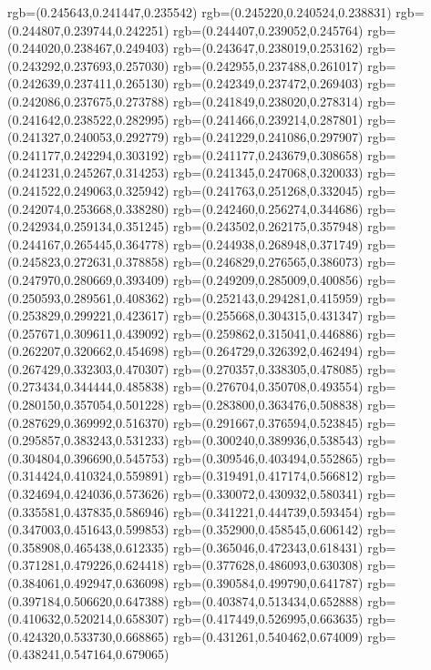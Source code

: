 {{{			rgb=(0.245643,0.241447,0.235542)
			rgb=(0.245220,0.240524,0.238831)
			rgb=(0.244807,0.239744,0.242251)
			rgb=(0.244407,0.239052,0.245764)
			rgb=(0.244020,0.238467,0.249403)
			rgb=(0.243647,0.238019,0.253162)
			rgb=(0.243292,0.237693,0.257030)
			rgb=(0.242955,0.237488,0.261017)
			rgb=(0.242639,0.237411,0.265130)
			rgb=(0.242349,0.237472,0.269403)
			rgb=(0.242086,0.237675,0.273788)
			rgb=(0.241849,0.238020,0.278314)
			rgb=(0.241642,0.238522,0.282995)
			rgb=(0.241466,0.239214,0.287801)
			rgb=(0.241327,0.240053,0.292779)
			rgb=(0.241229,0.241086,0.297907)
			rgb=(0.241177,0.242294,0.303192)
			rgb=(0.241177,0.243679,0.308658)
			rgb=(0.241231,0.245267,0.314253)
			rgb=(0.241345,0.247068,0.320033)
			rgb=(0.241522,0.249063,0.325942)
			rgb=(0.241763,0.251268,0.332045)
			rgb=(0.242074,0.253668,0.338280)
			rgb=(0.242460,0.256274,0.344686)
			rgb=(0.242934,0.259134,0.351245)
			rgb=(0.243502,0.262175,0.357948)
			rgb=(0.244167,0.265445,0.364778)
			rgb=(0.244938,0.268948,0.371749)
			rgb=(0.245823,0.272631,0.378858)
			rgb=(0.246829,0.276565,0.386073)
			rgb=(0.247970,0.280669,0.393409)
			rgb=(0.249209,0.285009,0.400856)
			rgb=(0.250593,0.289561,0.408362)
			rgb=(0.252143,0.294281,0.415959)
			rgb=(0.253829,0.299221,0.423617)
			rgb=(0.255668,0.304315,0.431347)
			rgb=(0.257671,0.309611,0.439092)
			rgb=(0.259862,0.315041,0.446886)
			rgb=(0.262207,0.320662,0.454698)
			rgb=(0.264729,0.326392,0.462494)
			rgb=(0.267429,0.332303,0.470307)
			rgb=(0.270357,0.338305,0.478085)
			rgb=(0.273434,0.344444,0.485838)
			rgb=(0.276704,0.350708,0.493554)
			rgb=(0.280150,0.357054,0.501228)
			rgb=(0.283800,0.363476,0.508838)
			rgb=(0.287629,0.369992,0.516370)
			rgb=(0.291667,0.376594,0.523845)
			rgb=(0.295857,0.383243,0.531233)
			rgb=(0.300240,0.389936,0.538543)
			rgb=(0.304804,0.396690,0.545753)
			rgb=(0.309546,0.403494,0.552865)
			rgb=(0.314424,0.410324,0.559891)
			rgb=(0.319491,0.417174,0.566812)
			rgb=(0.324694,0.424036,0.573626)
			rgb=(0.330072,0.430932,0.580341)
			rgb=(0.335581,0.437835,0.586946)
			rgb=(0.341221,0.444739,0.593454)
			rgb=(0.347003,0.451643,0.599853)
			rgb=(0.352900,0.458545,0.606142)
			rgb=(0.358908,0.465438,0.612335)
			rgb=(0.365046,0.472343,0.618431)
			rgb=(0.371281,0.479226,0.624418)
			rgb=(0.377628,0.486093,0.630308)
			rgb=(0.384061,0.492947,0.636098)
			rgb=(0.390584,0.499790,0.641787)
			rgb=(0.397184,0.506620,0.647388)
			rgb=(0.403874,0.513434,0.652888)
			rgb=(0.410632,0.520214,0.658307)
			rgb=(0.417449,0.526995,0.663635)
			rgb=(0.424320,0.533730,0.668865)
			rgb=(0.431261,0.540462,0.674009)
			rgb=(0.438241,0.547164,0.679065)
}}}
